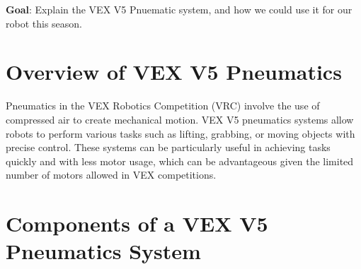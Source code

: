 \label{Pneumatics}
\textbf{Goal}: Explain the VEX V5 Pnuematic system, and how we could use it for our robot this season.
\section*{Overview of VEX V5 Pneumatics}

Pneumatics in the VEX Robotics Competition (VRC) involve the use of compressed air to create mechanical motion. VEX V5 pneumatics systems allow robots to perform various tasks such as lifting, grabbing, or moving objects with precise control. These systems can be particularly useful in achieving tasks quickly and with less motor usage, which can be advantageous given the limited number of motors allowed in VEX competitions.

\section*{Components of a VEX V5 Pneumatics System}

